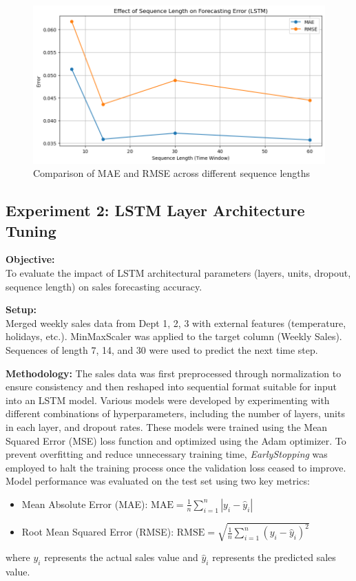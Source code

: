 \documentclass[conference]{IEEEtran}
\begin{document}
\begin{figure}[H]
\centering
\includegraphics[width=0.95\linewidth]{sequence_length_results.png}
\caption{Comparison of MAE and RMSE across different sequence lengths}
\label{fig:seq_length}
\end{figure}

\subsection{Experiment 2: LSTM Layer Architecture Tuning}

\textbf{Objective:} \\
To evaluate the impact of LSTM architectural parameters (layers, units, dropout, sequence length) on sales forecasting accuracy.

\textbf{Setup:} \\
Merged weekly sales data from Dept 1, 2, 3 with external features (temperature, holidays, etc.). MinMaxScaler was applied to the target column (Weekly Sales). Sequences of length 7, 14, and 30 were used to predict the next time step.

\textbf{Methodology:} The sales data was first preprocessed through normalization to ensure consistency and then reshaped into sequential format suitable for input into an LSTM model. Various models were developed by experimenting with different combinations of hyperparameters, including the number of layers, units in each layer, and dropout rates. These models were trained using the Mean Squared Error (MSE) loss function and optimized using the Adam optimizer. To prevent overfitting and reduce unnecessary training time, \textit{EarlyStopping} was employed to halt the training process once the validation loss ceased to improve. Model performance was evaluated on the test set using two key metrics:\begin{itemize}
  \item Mean Absolute Error (MAE): $\text{MAE} = \frac{1}{n}\sum_{i=1}^{n}|y_i - \hat{y}_i|$
  \item Root Mean Squared Error (RMSE): $\text{RMSE} = \sqrt{\frac{1}{n}\sum_{i=1}^{n}(y_i - \hat{y}_i)^2}$
\end{itemize}
where $y_i$ represents the actual sales value and $\hat{y}_i$ represents the predicted sales value.
\end{document}
